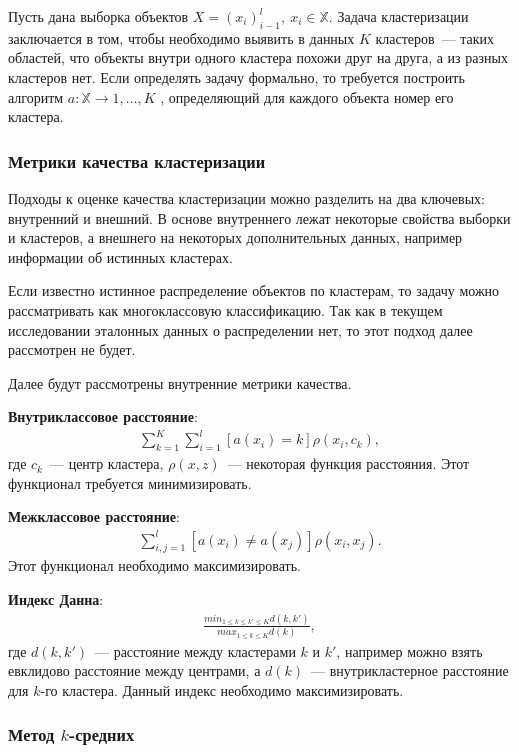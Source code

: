 \documentclass[12pt,a4paper]{article} %
\begin{document}
Пусть дана выборка объектов $X = (x_i)_{i-1}^{l},~x_i\in\mathbb{X}$. Задача кластеризации заключается в том, чтобы необходимо выявить в данных $K$ кластеров~--- таких областей, что объекты внутри одного кластера похожи друг на друга, а из разных кластеров нет. Если определять задачу формально, то требуется построить алгоритм $a: \mathbb{X}\rightarrow{1,\dots,K}$ , определяющий для каждого объекта номер его кластера.

\subsubsection{Метрики качества кластеризации}
Подходы к оценке качества кластеризации можно разделить на два ключевых: внутренний и внешний. В основе внутреннего лежат некоторые свойства выборки и кластеров, а внешнего на некоторых дополнительных данных, например информации об истинных кластерах.

Если известно истинное распределение объектов по кластерам, то задачу можно рассматривать как многоклассовую классификацию. Так как в текущем исследовании эталонных данных о распределении нет, то этот подход далее рассмотрен не будет.

Далее будут рассмотрены внутренние метрики качества. 

\textbf{Внутриклассовое расстояние}:
\begin{gather}\label{klastdist1}
	\sum\limits_{k=1}^{K}\sum\limits_{i=1}^{l}[a(x_i)=k]\rho(x_i, c_k),
\end{gather}
где $c_k$~--- центр кластера, $\rho(x,z)$~--- некоторая функция расстояния. Этот функционал требуется минимизировать.

\textbf{Межклассовое расстояние}:
\begin{gather}\label{klastdist2}
\sum\limits_{i,j = 1}^{l}[a(x_i)\not=a(x_j)]\rho(x_i, x_j).
\end{gather}
Этот функционал необходимо максимизировать.

\textbf{Индекс Данна}:
\begin{gather}\label{klastdist3}
	\frac{min_{1\leq k\leq k'\leq K}d(k,k')}{max_{1\leq k\leq K}d(k)}, 
\end{gather}
где $d(k,k')$~--- расстояние между кластерами $k$ и $k'$, например можно взять евклидово расстояние между центрами, а $d(k)$~--- внутрикластерное расстояние для $k$-го кластера. Данный индекс необходимо максимизировать.

\subsubsection{Метод $k$-средних}
\end{document}
